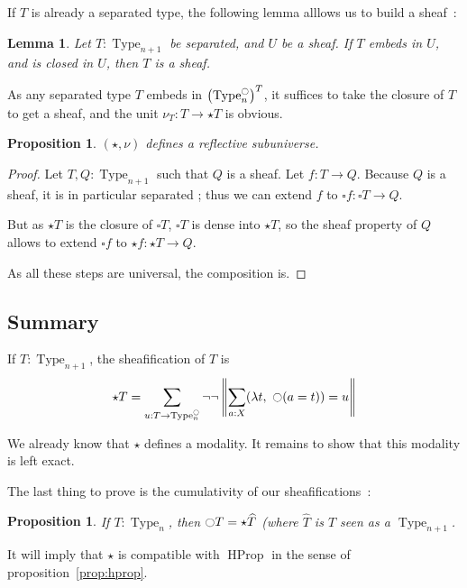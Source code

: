 \documentclass[conference]{IEEEtran}
\newtheorem{prop}[thm]{Proposition}
\newtheorem{lem}[thm]{Lemma}
\DeclareMathOperator{\Type}{Type}
\DeclareMathOperator{\HProp}{HProp}
\newcommand{\modal}{\ensuremath{\ocircle}}
\begin{document}
If $T$ is already a separated type, the following lemma alllows us
to build a sheaf~:
\begin{lem}
  Let $T:\Type_{n+1}$ be separated, and $U$ be a sheaf. If $T$ embeds
  in $U$, and is closed in $U$, then $T$ is a sheaf.
\end{lem}

As any separated type $T$ embeds in $\left(\Type_n^\modal\right)^T$,
it suffices to take the closure of $T$ to get a sheaf, and the unit
$\nu_T:T \to \star T$ is obvious.
\begin{prop}
  $(\star,\nu)$ defines a reflective subuniverse.
\end{prop}
\begin{proof}
  Let $T,Q:\Type_{n+1}$ such that $Q$ is a sheaf. Let $f:T\to Q$.
  Because $Q$ is a sheaf, it is in particular separated ; thus we can
  extend $f$ to $\square f:\square T\to Q$.

  But as $\star T$ is the closure of $\square T$, $\square T$ is dense
  into $\star T$, so the sheaf property of $Q$ allows to extend
  $\square f$ to $\star f:\star T \to Q$.

  As all these steps are universal, the composition is.
\end{proof}


\subsection{Summary}
\label{ssec:summary}

If $T:\Type_{n+1}$, the sheafification of $T$ is
$$\star T = \sum_{u:T \to \Type_n^\modal} \lnot\lnot\left\| \sum_{a:X} 
            (\lambda t,~\modal (a=t)) = u\right\|$$

We already know that $\star$ defines a modality. It remains to show
that this modality is left exact.

The last thing to prove is the cumulativity of our sheafifications~:
\begin{prop}
  If $T:\Type_n$, then $\modal T = \star \widehat T$ (where $\widehat
  T$ is $T$ seen as a $\Type_{n+1}$.
\end{prop}
It will imply that $\star$ is compatible with $\HProp$ in the sense of proposition~\ref{prop:hprop}.
\end{document}
